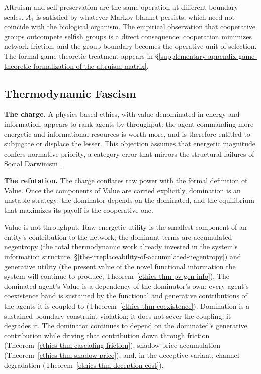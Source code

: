 \documentclass[11pt]{article}
\theoremstyle{plain}
\theoremstyle{definition}
\theoremstyle{remark}
\let\origsubsection\subsection
\renewcommand{\subsection}{\needspace{7\baselineskip}\origsubsection}
\begin{document}
Altruism and self-preservation are the same operation at different
boundary scales. \(A_1\) is satisfied by whatever Markov blanket
persists, which need not coincide with the biological organism. The
empirical observation that cooperative groups outcompete selfish groups
\citep{WilsonWilson2007, SoberWilson1998} is a direct consequence:
cooperation minimizes network friction, and the group boundary becomes
the operative unit of selection. The formal game-theoretic treatment
appears in
§\ref{supplementary-appendix-game-theoretic-formalization-of-the-altruism-matrix}.

\subsection{Thermodynamic Fascism}\label{thermodynamic-fascism}

\textbf{The charge.} A physics-based ethics, with value denominated in
energy and information, appears to rank agents by throughput: the agent
commanding more energetic and informational resources is worth more, and
is therefore entitled to subjugate or displace the lesser. This
objection assumes that energetic magnitude confers normative priority, a
category error that mirrors the structural failures of Social Darwinism
\citep{Spencer1864, Hofstadter1944}.

\textbf{The refutation.} The charge conflates raw power with the formal
definition of Value. Once the components of Value are carried
explicitly, domination is an unstable strategy: the dominator depends on
the dominated, and the equilibrium that maximizes its payoff is the
cooperative one.

Value is not throughput. Raw energetic utility is the smallest component
of an entity's contribution to the network; the dominant terms are
accumulated negentropy (the total thermodynamic work already invested in
the system's information structure,
§\ref{the-irreplaceability-of-accumulated-negentropy}) and generative
utility (the present value of the novel functional information the
system will continue to produce, Theorem~\ref{ethics-thm-pv-gen-info}).
The dominated agent's Value is a dependency of the dominator's own:
every agent's coexistence band is sustained by the functional and
generative contributions of the agents it is coupled to
(Theorem~\ref{ethics-thm-coexistence}). Domination is a sustained
boundary-constraint violation; it does not sever the coupling, it
degrades it. The dominator continues to depend on the dominated's
generative contribution while driving that contribution down through
friction (Theorem~\ref{ethics-thm-cascading-friction}), shadow-price
accumulation (Theorem~\ref{ethics-thm-shadow-price}), and, in the
deceptive variant, channel degradation
(Theorem~\ref{ethics-thm-deception-cost}).
\end{document}
